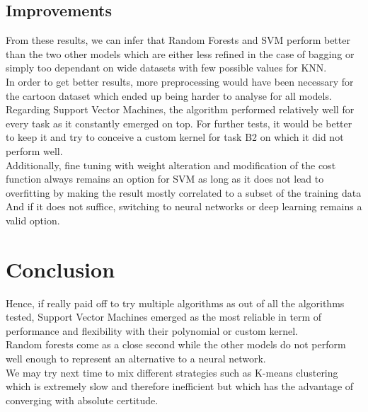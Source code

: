 \documentclass[a4paper,12pt,twoside,twocolumn]{article}
\begin{document}
\subsection{Improvements}
\label{sec:orgd5515c8}

From these results, we can infer that Random Forests and SVM perform better than the two other models which are either less refined in the case of bagging or simply too dependant on wide datasets with few possible values for KNN.\\

In order to get better results, more preprocessing would have been necessary for the cartoon dataset which ended up being harder to analyse for all models.\\

Regarding Support Vector Machines, the algorithm performed relatively well for every task as it constantly emerged on top. For further tests, it would be better to keep it and try to conceive a custom kernel for task B2 on which it did not perform well.\\

Additionally, fine tuning with weight alteration and modification of the cost function always remains an option for SVM as long as it does not lead to overfitting by making the result mostly correlated to a subset of the training data\\

And if it does not suffice, switching to neural networks or deep learning remains a valid option.\\

\section{Conclusion}
\label{sec:org1f1c890}

Hence, if really paid off to try multiple algorithms as out of all the algorithms tested, Support Vector Machines emerged as the most reliable in term of performance and flexibility with their polynomial or custom kernel.\\

Random forests come as a close second while the other models do not perform well enough to represent an alternative to a neural network.\\

We may try next time to mix different strategies such as K-means clustering which is extremely slow and therefore inefficient but which has the advantage of converging with absolute certitude.\\
\end{document}
